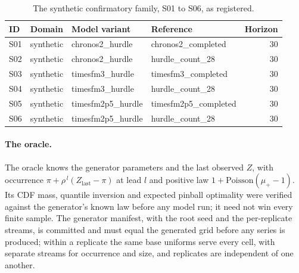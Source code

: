 \begin{table}[htbp]
\centering\small
\caption{The synthetic confirmatory family, S01 to S06, as registered.}
\label{tab:s2synfamily}
\begin{tabular}{llllr}
\toprule
ID & Domain & Model variant & Reference & Horizon \\
\midrule
S01 & synthetic & chronos2\_hurdle & chronos2\_completed & 30 \\
S02 & synthetic & chronos2\_hurdle & hurdle\_count\_28 & 30 \\
S03 & synthetic & timesfm3\_hurdle & timesfm3\_completed & 30 \\
S04 & synthetic & timesfm3\_hurdle & hurdle\_count\_28 & 30 \\
S05 & synthetic & timesfm2p5\_hurdle & timesfm2p5\_completed & 30 \\
S06 & synthetic & timesfm2p5\_hurdle & hurdle\_count\_28 & 30 \\
\bottomrule
\end{tabular}
\end{table}

\paragraph{The oracle.} The oracle knows the generator parameters and the last observed $Z$, with occurrence
$\pi + \rho^{\,l} (Z_{\text{last}} - \pi)$ at lead $l$ and positive law $1 + \text{Poisson}(\mu_{+} - 1)$.
Its CDF mass, quantile inversion and expected pinball optimality were verified against the generator's
known law before any model run; it need not win every finite sample. The generator manifest, with the root
seed and the per-replicate streams, is committed and must equal the generated grid before any series is
produced; within a replicate the same base uniforms serve every cell, with separate streams for occurrence
and size, and replicates are independent of one another.

